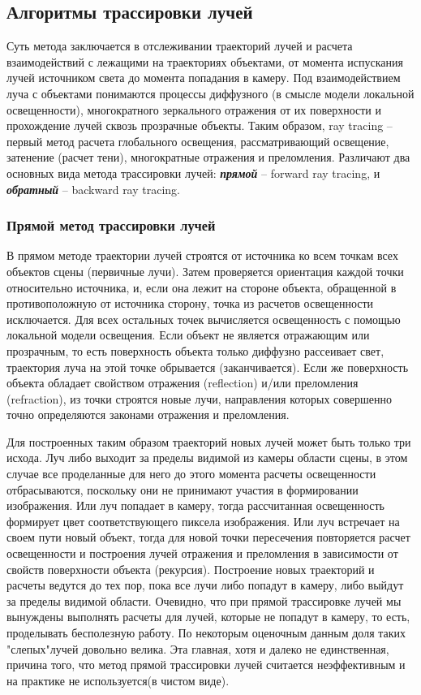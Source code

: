 \documentclass[12pt, a4paper]{article}
\begin{document}
\subsection{Алгоритмы трассировки лучей}
Суть метода заключается в отслеживании траекторий лучей и расчета взаимодействий с лежащими на траекториях объектами, от момента испускания лучей источником света до момента попадания в камеру. Под взаимодействием луча с объектами понимаются процессы диффузного (в смысле модели локальной освещенности), многократного зеркального отражения от их поверхности и прохождение лучей сквозь прозрачные объекты. Таким образом, ray tracing – первый метод расчета глобального освещения, рассматривающий освещение, затенение (расчет тени), многократные отражения и преломления. Различают два основных вида метода трассировки лучей: \textbf{\textit{прямой}} -- forward ray tracing, и \textbf{\textit{обратный}} -- backward ray tracing.

\subsubsection{Прямой метод трассировки лучей}
В прямом методе траектории лучей строятся от источника ко всем точкам всех объектов сцены (первичные лучи). Затем проверяется ориентация каждой точки относительно источника, и, если она лежит на стороне объекта, обращенной в противоположную от источника сторону, точка из расчетов освещенности исключается. Для всех остальных точек вычисляется освещенность с помощью локальной модели освещения. Если объект не является отражающим или прозрачным, то есть поверхность объекта только диффузно рассеивает свет, траектория луча на этой точке обрывается (заканчивается). Если же поверхность объекта обладает свойством отражения (reflection) и/или преломления (refraction), из точки строятся новые лучи, направления которых совершенно точно определяются законами отражения и преломления.
\par
    Для построенных таким образом траекторий новых лучей может быть только три исхода. Луч либо выходит за пределы видимой из камеры области сцены, в этом случае все проделанные для него до этого момента расчеты освещенности отбрасываются, поскольку они не принимают участия в формировании изображения. Или луч попадает в камеру, тогда рассчитанная освещенность формирует цвет соответствующего пиксела изображения. Или луч встречает на своем пути новый
объект, тогда для новой точки пересечения повторяется расчет освещенности и построения лучей отражения и преломления в зависимости от свойств поверхности объекта (рекурсия). Построение новых траекторий и расчеты ведутся до тех пор, пока все лучи либо попадут в камеру, либо выйдут за пределы видимой области. Очевидно, что при прямой трассировке лучей мы вынуждены выполнять расчеты для лучей, которые не попадут в камеру, то есть, проделывать бесполезную работу. По некоторым оценочным данным доля таких "слепых"лучей довольно велика. Эта главная, хотя и далеко не единственная, причина того, что метод прямой трассировки лучей считается неэффективным и на практике не используется(в чистом виде).
\end{document}
